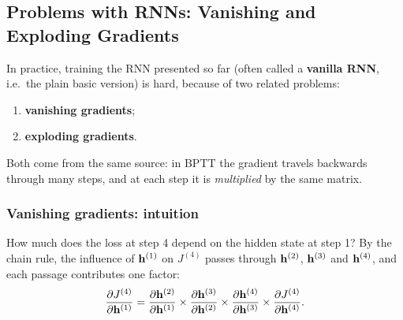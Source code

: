 \subsection{Problems with RNNs: Vanishing and Exploding Gradients}
\label{sec:vanishing-exploding-gradients}

In practice, training the RNN presented so far (often called a \textbf{vanilla RNN},
i.e.\ the plain basic version) is hard, because of two related problems:
\begin{enumerate}[nosep]
  \item \textbf{vanishing gradients};
  \item \textbf{exploding gradients}.
\end{enumerate}
Both come from the same source: in BPTT the gradient travels backwards through many
steps, and at each step it is \emph{multiplied} by the same matrix.

\subsubsection{Vanishing gradients: intuition}

How much does the loss at step 4 depend on the hidden state at step 1? By the chain
rule, the influence of $\mathbf{h}^{(1)}$ on $J^{(4)}$ passes through $\mathbf{h}^{(2)}$,
$\mathbf{h}^{(3)}$ and $\mathbf{h}^{(4)}$, and each passage contributes one factor:
\[
  \frac{\partial J^{(4)}}{\partial \mathbf{h}^{(1)}} =
  \frac{\partial \mathbf{h}^{(2)}}{\partial \mathbf{h}^{(1)}} \times
  \frac{\partial \mathbf{h}^{(3)}}{\partial \mathbf{h}^{(2)}} \times
  \frac{\partial \mathbf{h}^{(4)}}{\partial \mathbf{h}^{(3)}} \times
  \frac{\partial J^{(4)}}{\partial \mathbf{h}^{(4)}} .
\]

